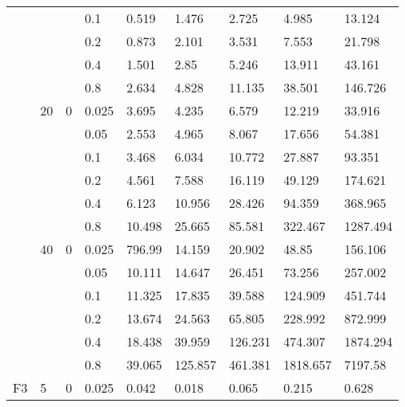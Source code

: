 \begin{longtable}{|l|l|l|l|l|l|l|l|l|}
\cmidrule{4-9} &     &          & 0.1            & 0.519      & 1.476      & 2.725      & 4.985      & 13.124     \\
\cmidrule{4-9} &     &          & 0.2            & 0.873      & 2.101      & 3.531      & 7.553      & 21.798     \\
\cmidrule{4-9} &     &          & 0.4            & 1.501      & 2.85       & 5.246      & 13.911     & 43.161     \\
\cmidrule{4-9} &     &          & 0.8            & 2.634      & 4.828      & 11.135     & 38.501     & 146.726    \\
\cmidrule{2-9} & 20  & 0        & 0.025          & 3.695      & 4.235      & 6.579      & 12.219     & 33.916     \\
\cmidrule{4-9} &     &          & 0.05           & 2.553      & 4.965      & 8.067      & 17.656     & 54.381     \\
\cmidrule{4-9} &     &          & 0.1            & 3.468      & 6.034      & 10.772     & 27.887     & 93.351     \\
\cmidrule{4-9} &     &          & 0.2            & 4.561      & 7.588      & 16.119     & 49.129     & 174.621    \\
\cmidrule{4-9} &     &          & 0.4            & 6.123      & 10.956     & 28.426     & 94.359     & 368.965    \\
\cmidrule{4-9} &     &          & 0.8            & 10.498     & 25.665     & 85.581     & 322.467    & 1287.494   \\
\cmidrule{3-9} & 40  & 0        & 0.025          & 796.99     & 14.159     & 20.902     & 48.85      & 156.106    \\
\cmidrule{4-9} &     &          & 0.05           & 10.111     & 14.647     & 26.451     & 73.256     & 257.002    \\
\cmidrule{4-9} &     &          & 0.1            & 11.325     & 17.835     & 39.588     & 124.909    & 451.744    \\
\cmidrule{4-9} &     &          & 0.2            & 13.674     & 24.563     & 65.805     & 228.992    & 872.999    \\
\cmidrule{4-9} &     &          & 0.4            & 18.438     & 39.959     & 126.231    & 474.307    & 1874.294   \\
\cmidrule{4-9} &     &          & 0.8            & 39.065     & 125.857    & 461.381    & 1818.657   & 7197.58    \\ \midrule
F3             & 5   & 0        & 0.025          & 0.042      & 0.018      & 0.065      & 0.215      & 0.628      \\

\end{longtable}
